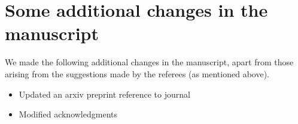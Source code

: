 \documentclass{article}
\begin{document}
\section{Some additional changes in the manuscript}
We made the following additional changes in the manuscript, apart from those arising from the suggestions made by the referees (as mentioned above).
\begin{itemize}
	\item Updated an arxiv preprint reference to journal
	\item Modified acknowledgments
\end{itemize}



\end{document}
